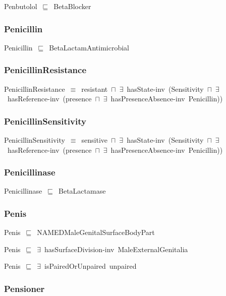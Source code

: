 \documentclass{article}
\begin{document}
Penbutolol~\ensuremath{\sqsubseteq}~BetaBlocker~

\subsubsection*{Penicillin}

Penicillin~\ensuremath{\sqsubseteq}~BetaLactamAntimicrobial~

\subsubsection*{PenicillinResistance}

PenicillinResistance~\ensuremath{\equiv}~resistant~\ensuremath{\sqcap}~\ensuremath{\exists}~hasState-inv~(Sensitivity~\ensuremath{\sqcap}~\ensuremath{\exists}~hasReference-inv~(presence~\ensuremath{\sqcap}~\ensuremath{\exists}~hasPresenceAbsence-inv~Penicillin))

\subsubsection*{PenicillinSensitivity}

PenicillinSensitivity~\ensuremath{\equiv}~sensitive~\ensuremath{\sqcap}~\ensuremath{\exists}~hasState-inv~(Sensitivity~\ensuremath{\sqcap}~\ensuremath{\exists}~hasReference-inv~(presence~\ensuremath{\sqcap}~\ensuremath{\exists}~hasPresenceAbsence-inv~Penicillin))

\subsubsection*{Penicillinase}

Penicillinase~\ensuremath{\sqsubseteq}~BetaLactamase~

\subsubsection*{Penis}

Penis~\ensuremath{\sqsubseteq}~NAMEDMaleGenitalSurfaceBodyPart~

Penis~\ensuremath{\sqsubseteq}~\ensuremath{\exists}~hasSurfaceDivision-inv~MaleExternalGenitalia~

Penis~\ensuremath{\sqsubseteq}~\ensuremath{\exists}~isPairedOrUnpaired~unpaired~

\subsubsection*{Pensioner}
\end{document}
